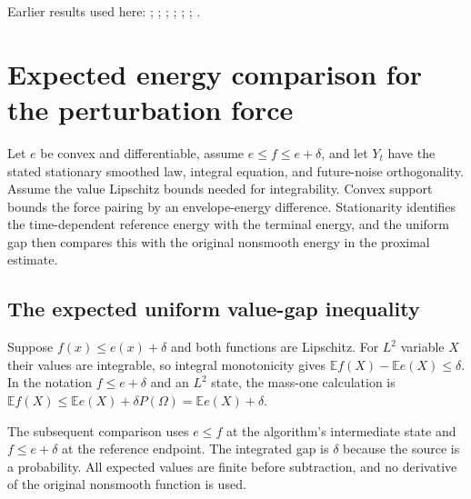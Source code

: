\documentclass[11pt,a4paper]{report}
\begin{document}
Earlier results used here: \cite[Section~3.13.2]{LangevinLean2026ULASC}; \cite[Section~3.25.1]{LangevinLean2026ULASC}; \cite[Section~3.25.2]{LangevinLean2026ULASC}; \cite[Section~3.25.3]{LangevinLean2026ULASC}; \cite[Section~3.54.2]{LangevinLean2026ULASC}; \cite[Section~3.54.4]{LangevinLean2026ULASC}; \cite[Section~3.54.8]{LangevinLean2026ULASC}.
\section{\texorpdfstring{Expected energy comparison for the perturbation force}{Expected energy comparison for the perturbation force}}
\label{proof-module-ProximalLangevin-SplittingCrossEnergy-lean}


Let \(e\) be convex and differentiable, assume \(e\le f\le e+\delta\), and let \(Y_t\) have the stated stationary smoothed law, integral equation, and future-noise orthogonality. Assume the value Lipschitz bounds needed for integrability. Convex support bounds the force pairing by an envelope-energy difference. Stationarity identifies the time-dependent reference energy with the terminal energy, and the uniform gap then compares this with the original nonsmooth energy in the proximal estimate.

\subsection{\texorpdfstring{The expected uniform value-gap inequality}{The expected uniform value-gap inequality}}
\label{report-step-ProximalLangevin-SplittingCrossEnergy-lean-1}


Suppose \(f(x)\le e(x)+\delta\) and both functions are Lipschitz. For \(L^2\) variable \(X\) their values are integrable, so integral monotonicity gives \(\mathbb E f(X)-\mathbb E e(X)\le\delta\). In the notation \(f\le e+\delta\) and an \(L^2\) state, the mass-one calculation is \(\mathbb Ef(X)\le\mathbb Ee(X)+\delta P(\Omega)=\mathbb Ee(X)+\delta\).



The subsequent comparison uses \(e\le f\) at the algorithm’s intermediate state and \(f\le e+\delta\) at the reference endpoint. The integrated gap is \(\delta\) because the source is a probability. All expected values are finite before subtraction, and no derivative of the original nonsmooth function is used.
\end{document}
